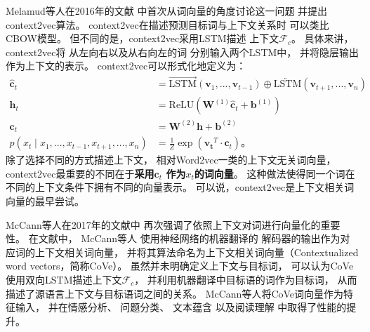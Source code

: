 Melamud等人在2016年的文献
中首次从词向量的角度讨论这一问题
并提出context2vec算法。
context2vec在描述预测目标词与上下文关系时
可以类比CBOW模型。
但不同的是，context2vec采用LSTM描述
上下文$\mathcal{F}_c$。
具体来讲，context2vec将
从左向右以及从右向左的词
分别输入两个LSTM中，
并将隐层输出作为上下文的表示。
context2vec可以形式化地定义为：
\begin{align*}
\hat{\mathbf{c}}_t &= \overrightarrow{\text{LSTM}}(\mathbf{v}_{1}, ..., \mathbf{v}_{t-1}) \oplus \overleftarrow{\text{LSTM}}(\mathbf{v}_{t+1}, ..., \mathbf{v}_{n}) \\
\mathbf{h}_t & = \text{ReLU}(\mathbf{W}^{(1)} \hat{\mathbf{c}}_t  + \mathbf{b}^{(1)}) \\
\mathbf{c}_t &= \mathbf{W}^{(2)} \mathbf{h} + \mathbf{b}^{(2)} \\
p(x_t \mid x_1, ..., x_{t-1}, x_{t+1}, ..., x_{n}) & = \frac{1}{Z} \exp(\mathbf{v_t}^T \cdot \mathbf{c}_t)\text{。}
\end{align*}
除了选择不同的方式描述上下文，
相对Word2vec一类的上下文无关词向量，
context2vec最重要的不同在于\textbf{采用$\mathbf{c}_t$
作为$x_t$的词向量}。
这种做法使得同一个词在不同的上下文条件下拥有不同的向量表示。
可以说，context2vec是上下文相关词向量的最早尝试。

McCann等人在2017年的文献中
再次强调了依照上下文对词进行向量化的重要性。
在文献中，
McCann等人
使用神经网络的机器翻译\cite{NIPS2014_5346,luong-pham-manning:2015:EMNLP,DBLP:journals/corr/BahdanauCB14}的
解码器的输出作为对应词的上下文相关词向量，
并将其算法命名为上下文相关词向量（Contextualized word vectors，简称CoVe）。
虽然并未明确定义上下文与目标词，
可以认为CoVe使用双向LSTM描述上下文$\mathcal{F}_c$，
并利用机器翻译中目标语的词作为目标词，
从而描述了源语言上下文与目标语词之间的关系。
McCann等人将CoVe词向量作为特征输入，
并在情感分析\cite{socher-EtAl:2013:ACL2013}、
问题分类\cite{DBLP:conf/trec/Voorhees99}、
文本蕴含\cite{bowman-EtAl:2015:EMNLP}
以及阅读理解\cite{rajpurkar-EtAl:2016:EMNLP2016}
中取得了性能的提升。

